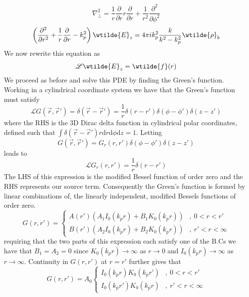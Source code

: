 \begin{equation}
\nabla_{\perp}^2=\frac{1}{r}\frac{\partial }{\partial r}r\frac{\partial }{\partial r} +\frac{1}{r^2}\frac{\partial^2 }{\partial \phi^2} 
\end{equation}
\begin{equation}
 \left(\frac{\partial^2 }{\partial r^2}+\frac{1}{r}\frac{\partial }{\partial r} -k^2_p\right)\wtilde{E}_z
=4\pi ik_p^2 \frac{k}{k^2-k_p^2}\wtilde{\rho}_b
\label{diffeq_in_transformspace}
\end{equation}
We now rewrite this equation as
\begin{equation}
\mathscr{L}\wtilde{E}_z= \wtilde{f}(r)
\end{equation}
We proceed as before and solve this PDE by finding the Green's function. Working in a cylindrical coordinate system we have that the Green's function must satisfy 
\begin{equation}
\mathscr{L}G(\vec{r},\vec{r}')=\delta(\vec{r}-\vec{r}')=\frac{1}{r}\delta(r-r')\delta(\phi-\phi')\delta(z-z')
\end{equation}
where the RHS is the 3D Dirac delta function in cylindrical polar coordinates, defined such that 
$\int\delta(\vec{r}-\vec{r}')r\mathrm{d}r\mathrm{d}\phi\mathrm{d}z=1$. Letting 
\begin{equation}
G(\vec{r},\vec{r}')=G_r(r,r')\delta(\phi-\phi')\delta(z-z')
\end{equation}
leads to 
\begin{equation}
\mathscr{L}G_r(r,r')=\frac{1}{r}\delta(r-r')
\end{equation}
The LHS of this expression is the modified Bessel function of order zero and the RHS represents our source term. Consequently the Green's function is formed by linear combinations of, the linearly independent, modified Bessels functions of order zero. 
\begin{equation}
G\left(r,r'\right)=\left\{ \begin{array}{ll}
A(r')(A_1 I_0(k_pr)+B_1K_0(k_pr)) &,~ 0<r<r'\\
B(r')(A_2 I_0(k_pr)+B_2K_0(k_pr))  &,~ r'<r<\infty
\end{array}\right.
\end{equation}
requiring that the two parts of this expression each satisfy one of the B.Cs we have that $B_1=A_2=0$ since $K_0(k_pr)\to \infty$ as $r\to 0$ and $I_0(k_pr)\to \infty$ as $r\to \infty$. Continuity in $G(r,r')$ at $r=r'$ further gives that 
\begin{equation}
G\left(r,r'\right)=A_0\left\{ \begin{array}{ll}
I_0(k_pr)K_0(k_pr') &,~ 0<r<r'\\
I_0(k_pr')K_0(k_pr)  &,~ r'<r<\infty
\end{array}\right.
\end{equation}
